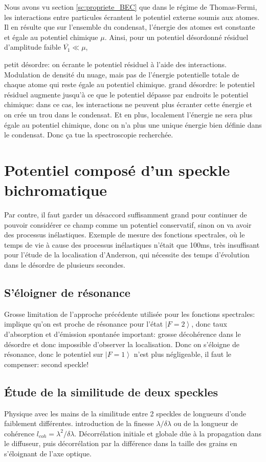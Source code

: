 Nous avons vu section \ref{sc:propriete_BEC} que dans le régime de Thomas-Fermi, les interactions entre particules écrantent le potentiel externe soumis aux atomes. Il en résulte que sur l'ensemble du condensat, l'énergie des atomes est constante et égale au potentiel chimique $\mu$. Ainsi, pour un potentiel désordonné résiduel d'amplitude faible $\overline{V_1}\ll\mu$, 

petit désordre: on écrante le potentiel résiduel à l'aide des interactions. Modulation de densité du nuage, mais pas de l'énergie potentielle totale de chaque atome qui reste égale au potentiel chimique. 
grand désordre: le potentiel résiduel augmente jusqu'à ce que le potentiel dépasse par endroits le potentiel chimique: dans ce cas, les interactions ne peuvent plus écranter cette énergie et on crée un trou dans le condensat. Et en plus, localement l'énergie ne sera plus égale au potentiel chimique, donc on n'a plus une unique énergie bien définie dans le condensat. Donc ça tue la spectroscopie recherchée.













\section{Potentiel composé d'un speckle bichromatique}
\label{sc:speckle_bichromatique}

Par contre, il faut garder un désaccord suffisamment grand pour continuer de pouvoir considérer ce champ comme un potentiel conservatif, sinon on va avoir des processus inélastiques. Exemple de mesure des fonctions spectrales, où le temps de vie à cause des processus inélastiques n'était que 100ms, très insuffisant pour l'étude de la localisation d'Anderson, qui nécessite des temps d'évolution dans le désordre de plusieurs secondes.

\subsection{S'éloigner de résonance}
Grosse limitation de l'approche précédente utilisée pour les fonctions spectrales: implique qu'on est proche de résonance pour l'état $\left| F=2 \right\rangle$, donc taux d'absorption et d'émission spontanée important: grosse décohérence dans le désordre et donc impossible d'observer la localisation.
Donc on s'éloigne de résonance, donc le potentiel sur $\left| F=1 \right\rangle$ n'est plus négligeable, il faut le compenser: second speckle! 
\subsection{Étude de la similitude de deux speckles}
Physique avec les mains de la similitude entre 2 speckles de longueurs d'onde faiblement différentes. introduction de la finesse $\lambda / \delta\lambda$ ou de la longueur de cohérence $l_{coh}=\lambda^2/\delta\lambda$.
Décorrélation initiale et globale dûe à la propagation dans le diffuseur, puis décorrélation par la différence dans la taille des grains en s'éloignant de l'axe optique.